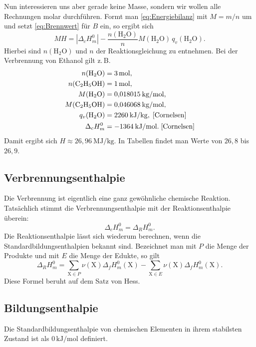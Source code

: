 \documentclass[a4paper,11pt,fleqn,twocolumn]{article}
\newcommand{\unit}[1]{\mathrm{#1}}
\begin{document}
Nun interessieren uns aber gerade keine Masse, sondern wir wollen
alle Rechnungen molar durchführen. Formt man
\eqref{eq:Energiebilanz} mit $M=m/n$ um und setzt \eqref{eq:Brennwert}
für $B$ ein, so ergibt sich
\begin{equation}
MH = |\Delta_c H_m^0| - \frac{n(\mathrm{H_2O})}{n}
M(\mathrm{H_2O})\,q_v(\mathrm{H_2O}).
\end{equation}
Hierbei sind $n(\mathrm{H_2O})$ und $n$ der Reaktionsgleichung
zu entnehmen.
Bei der Verbrennung von Ethanol gilt z.\,B.
\[\begin{split}
n(\mathrm{H_2O}) &= 3\,\unit{mol},\\
n(\mathrm{C_2H_5OH}) &= 1\,\unit{mol},\\
M(\mathrm{H_2O}) &= 0{,}018015\:\unit{kg/mol},\\
M(\mathrm{C_2H_5OH}) &= 0{,}046068\:\unit{kg/mol},\\
q_v(\mathrm{H_2O}) &= 2260\:\unit{kJ/kg},\;\cite{Cornelsen}\\
\Delta_c H_m^0 &= -1364\:\unit{kJ/mol}.\;\cite{Cornelsen}
\end{split}
\]
Damit ergibt sich $H\approx 26{,}96\:\unit{MJ/kg}$.
In Tabellen findet man Werte von $26{,}8$ bis $26{,}9$.

\subsection{Verbrennungsenthalpie}
Die Verbrennung ist eigentlich eine ganz gewöhnliche
chemische Reaktion. Tatsächlich stimmt die Verbrennungsenthalpie
mit der Reaktionsenthalpie überein:
\begin{equation}
\Delta_c H_m^0 = \Delta_R H_m^0.
\end{equation}
Die Reaktionsenthalpie lässt sich wiederum berechnen, wenn die
Standardbildungsenthalpien bekannt sind. Bezeichnet man mit
$P$ die Menge der Produkte und mit $E$ die Menge der Edukte, so gilt
\begin{equation}
\Delta_R H_m^0 = \sum_{\mathrm X\in P}\nu(\mathrm X)\Delta_f H_m^0(\mathrm X)
- \sum_{\mathrm X\in E}\nu(\mathrm X)\Delta_f H_m^0(\mathrm X).
\end{equation}
Diese Formel beruht auf dem Satz von Hess.

\subsection{Bildungsenthalpie}
Die Standardbildungsenthalpie von chemischen Elementen
in ihrem stabilsten Zustand ist als $0\,\unit{kJ/mol}$ definiert.
\end{document}
